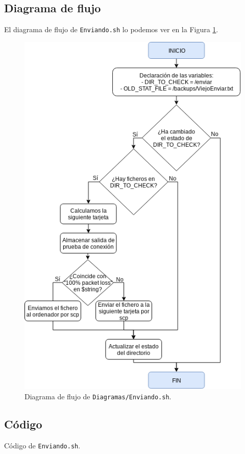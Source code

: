 \subsection{Diagrama de flujo}
El diagrama de flujo de \texttt{Enviando.sh} lo podemos ver en la Figura \ref{Diagrama de flujo de Enviando.sh}.
\begin{figure}[h]
	\centering
	\includegraphics[scale=0.65]{Anexos/Anexo3/Diagramas/Enviando.png}
	\caption{Diagrama de flujo de \texttt{Diagramas/Enviando.sh}.}
	\label{Diagrama de flujo de Enviando.sh}
\end{figure}

\newpage
\subsection{Código}

\begin{center}
	Código de \texttt{Enviando.sh}.
\end{center}


